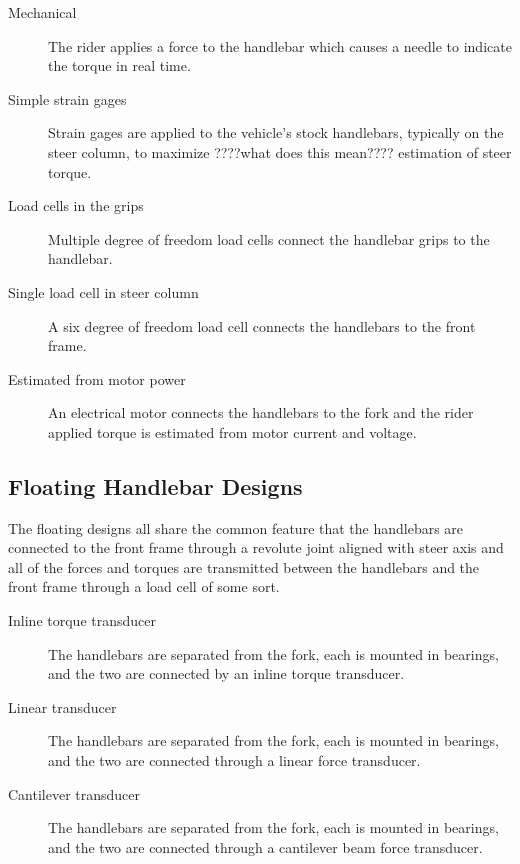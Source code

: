 \documentclass[10pt]{article}
\begin{document}
\begin{description}
  \item[Mechanical] The rider applies a force to the handlebar which causes a
    needle to indicate the torque in real
    time.~\cite{Wilson-Jones1951,Cheng2003,Moore2012}
  \item[Simple strain gages] Strain gages are applied to the vehicle's stock
    handlebars, typically on the steer column, to maximize ????what does this mean???? estimation of steer
    torque.~\cite{Eaton1973,Lorenzo1997,Capitani2006}
  \item[Load cells in the grips] Multiple degree of freedom load cells connect
    the handlebar grips to the handlebar.~\cite{Evertse2010}
  \item[Single load cell in steer column] A six degree of freedom load cell
    connects the handlebars to the front frame.~\cite{Kageyama?}
  \item[Estimated from motor power] An electrical motor connects the handlebars
    to the fork and the rider applied torque is estimated from motor current
    and voltage.~\cite{Iuchi2006,Appelman2012,Peterson2013}
\end{description}


\subsection*{Floating Handlebar Designs}

The floating designs all share the common feature that the handlebars are
connected to the front frame through a revolute joint aligned with steer axis
and all of the forces and torques are transmitted between the handlebars and the
front frame through a load cell of some sort.

\begin{description}
  \item[Inline torque transducer] The handlebars are separated from the fork,
    each is mounted in bearings, and the two are connected by an inline torque
    transducer.~\cite{Weir1979a,Cain2010,Cain2012,Moore2012}
  \item[Linear transducer] The handlebars are separated from the fork, each is
    mounted in bearings, and the two are connected through a linear force
    transducer.~\cite{Cheng2003,James2002,Teerhuis2010}
  \item[Cantilever transducer] The handlebars are separated from the fork, each
    is mounted in bearings, and the two are connected through a cantilever beam
    force transducer.~ \cite{Bortoluzzi2000,Biral2003,Ouden2011}
\end{description}
\end{document}
